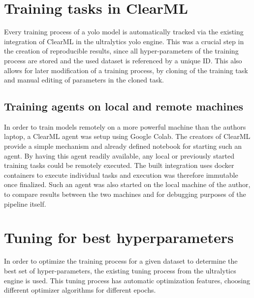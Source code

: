 \documentclass[Bachelor, BIC, english, fhCitStyle, IEEE]{BASE/twbook} %
\begin{document}
\section{Training tasks in ClearML}
Every training process of a \ac{yolo} model is automatically tracked via the existing integration of ClearML in the ultralytics \ac{yolo} engine. This was a crucial step in the creation of reproducible results, since all hyper-parameters of the training process are stored and the used dataset is referenced by a unique ID. This also allows for later modification of a training process, by cloning of the training task and manual editing of parameters in the cloned task.
\subsection{Training agents on local and remote machines}
In order to train models remotely on a more powerful machine than the authors laptop, a ClearML agent was setup using Google Colab. The creators of ClearML provide a simple mechanism and already defined notebook \autocite{ClearMLAgentGoogle} for starting such an agent. By having this agent readily available, any local or previously started training tasks could be remotely executed. The built integration uses docker containers to execute individual tasks and execution was therefore immutable once finalized. Such an agent was also started on the local machine of the author, to compare results between the two machines and for debugging purposes of the pipeline itself.
\section{Tuning for best hyperparameters}
In order to optimize the training process for a given dataset to determine the best set of hyper-parameters, the existing tuning process from the ultralytics engine \autocite{ultralyticsTuner} is used. This tuning process has automatic optimization features, choosing different optimizer algorithms for different epochs.
\end{document}
